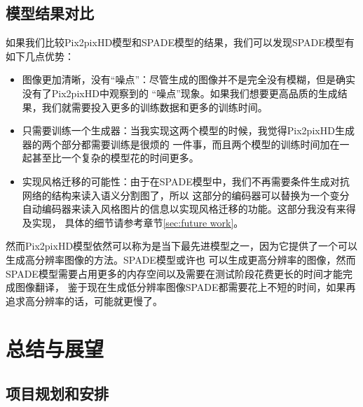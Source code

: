 \documentclass[supercite]{HustGraduPaper}
\theoremstyle{definition}
\begin{document}
\subsection{模型结果对比}

如果我们比较Pix2pixHD模型和SPADE模型的结果，我们可以发现SPADE模型有如下几点优势：
\begin{itemize}
  \item 图像更加清晰，没有“噪点”：尽管生成的图像并不是完全没有模糊，但是确实没有了Pix2pixHD中观察到的
  “噪点”现象。如果我们想要更高品质的生成结果，我们就需要投入更多的训练数据和更多的训练时间。
  \item 只需要训练一个生成器：当我实现这两个模型的时候，我觉得Pix2pixHD生成器的两个部分都需要训练是很烦的
  一件事，而且两个模型的训练时间加在一起甚至比一个复杂的模型花的时间更多。
  \item 实现风格迁移的可能性：由于在SPADE模型中，我们不再需要条件生成对抗网络的结构来读入语义分割图了，所以
  这部分的编码器可以替换为一个变分自动编码器来读入风格图片的信息以实现风格迁移的功能。这部分我没有来得及实现，
  具体的细节请参考章节\ref{sec:future work}。
\end{itemize}

然而Pix2pixHD模型依然可以称为是当下最先进模型之一，因为它提供了一个可以生成高分辨率图像的方法。SPADE模型或许也
可以生成更高分辨率的图像，然而SPADE模型需要占用更多的内存空间以及需要在测试阶段花费更长的时间才能完成图像翻译，
鉴于现在生成低分辨率图像SPADE都需要花上不短的时间，如果再追求高分辨率的话，可能就更慢了。

\section{总结与展望}
\subsection{项目规划和安排}
\end{document}
